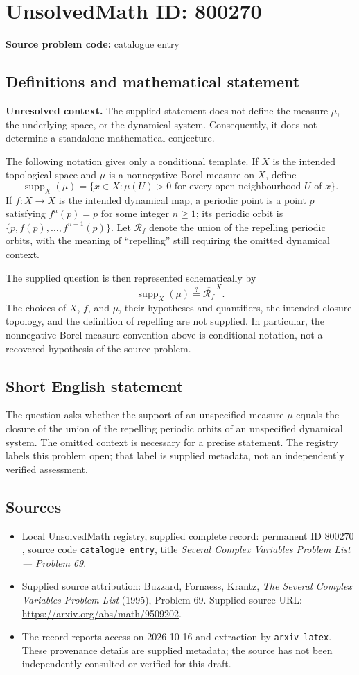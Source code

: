 \documentclass[11pt]{article}
\begin{document}
\section*{UnsolvedMath ID: 800270}
\textbf{Source problem code:} catalogue entry
\subsection{Definitions and mathematical statement}
\textbf{Unresolved context.} The supplied statement does not define the measure \(\mu\), the underlying space, or the dynamical system. Consequently, it does not determine a standalone mathematical conjecture.

The following notation gives only a conditional template. If \(X\) is the intended topological space and \(\mu\) is a nonnegative Borel measure on \(X\), define
\[
\operatorname{supp}_X(\mu)=\{x\in X:\mu(U)>0\text{ for every open neighbourhood }U\text{ of }x\}.
\]
If \(f:X\to X\) is the intended dynamical map, a periodic point is a point \(p\) satisfying \(f^n(p)=p\) for some integer \(n\geq 1\); its periodic orbit is \(\{p,f(p),\ldots,f^{n-1}(p)\}\). Let \(\mathcal R_f\) denote the union of the repelling periodic orbits, with the meaning of ``repelling'' still requiring the omitted dynamical context.

The supplied question is then represented schematically by
\[
\operatorname{supp}_X(\mu)\stackrel{?}{=}\overline{\mathcal R_f}^{\,X}.
\]
The choices of \(X\), \(f\), and \(\mu\), their hypotheses and quantifiers, the intended closure topology, and the definition of repelling are not supplied. In particular, the nonnegative Borel measure convention above is conditional notation, not a recovered hypothesis of the source problem.
\subsection{Short English statement}
The question asks whether the support of an unspecified measure \(\mu\) equals the closure of the union of the repelling periodic orbits of an unspecified dynamical system. The omitted context is necessary for a precise statement. The registry labels this problem open; that label is supplied metadata, not an independently verified assessment.
\subsection{Sources}
\begin{itemize}
\item Local UnsolvedMath registry, supplied complete record: permanent ID \(800270\), source code \texttt{catalogue entry}, title \emph{Several Complex Variables Problem List --- Problem 69}.
\item Supplied source attribution: Buzzard, Fornaess, Krantz, \emph{The Several Complex Variables Problem List} (1995), Problem 69. Supplied source URL: \url{https://arxiv.org/abs/math/9509202}.
\item The record reports access on 2026-10-16 and extraction by \texttt{arxiv\_latex}. These provenance details are supplied metadata; the source has not been independently consulted or verified for this draft.
\end{itemize}
\end{document}
